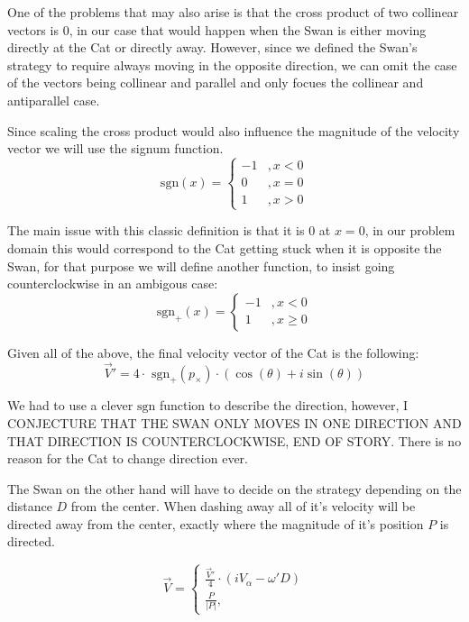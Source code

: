 \documentclass[12pt]{article}
\begin{document}
\begin{tabular*}{\linewidth}{|l|c|r|}
	
\end{tabular*}

One of the problems that may also arise is that the cross product of two collinear\cite{vectorterminology} vectors is $0$, in our case that would happen when the Swan is either moving directly at the Cat or directly away. However, since we defined the Swan's strategy to require always moving in the opposite direction, we can omit the case of the vectors being collinear and parallel\cite{vectorterminology} and only focues the collinear and antiparallel\cite{vectorterminology} case.

Since scaling the cross product would also influence the magnitude of the velocity vector we will use the signum function. $$\text{sgn}(x) = \left\{ 
	\begin{aligned}
		-1&, x < 0\\
		0&, x = 0\\
		1&, x > 0
	\end{aligned}
\right.$$

The main issue with this classic definition is that it is $0$ at $x = 0$, in our problem domain this would correspond to the Cat getting stuck when it is opposite the Swan, for that purpose we will define another function, to insist going counterclockwise in an ambigous case:$$\text{sgn}_+(x) = \left\{ 
	\begin{aligned}
		-1&, x < 0\\
		1&, x \geq 0
	\end{aligned}
\right.$$

Given all of the above, the final velocity vector of the Cat is the following: $$
\vec{V}' = 4 \cdot \text{ sgn}_+ (p_\times) \cdot (\cos(\theta) + i \sin(\theta))
$$

We had to use a clever $\text{sgn}$ function to describe the direction, however, I CONJECTURE THAT THE SWAN ONLY MOVES IN ONE DIRECTION AND THAT DIRECTION IS COUNTERCLOCKWISE, END OF STORY. There is no reason for the Cat to change direction ever.

The Swan on the other hand will have to decide on the strategy depending on the distance $D$ from the center. When dashing away all of it's velocity will be directed away from the center, exactly where the magnitude of it's position $P$ is directed.

\begin{equation*}
	\vec{V} = \left\{ 
		\begin{aligned}
			\frac{\vec{V}'}{4} \cdot (i V_\alpha  - \omega' D) \\
			\frac{P}{|P|}, 
		\end{aligned}
	\right.
\end{equation*}
\end{document}
